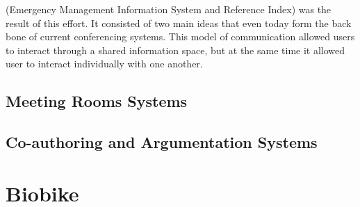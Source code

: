 (Emergency Management Information System and Reference Index) was
the result of this effort. It consisted of two main ideas that even
today form the back bone of current conferencing systems. This model
of communication allowed users to interact through a shared
information space, but at the same time it allowed user to interact
individually with one another. 
\subsection{Meeting Rooms Systems}

\subsection{Co-authoring and Argumentation Systems}

\section{Biobike}













